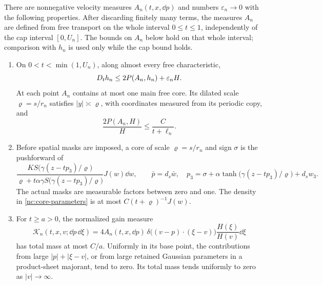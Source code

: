 \begin{lemma}
\label{nc:core-kernels}
There are nonnegative velocity measures \(A_n(t,x,\dd p)\) and numbers
\(\varepsilon_n\to0\) with the following properties.
After discarding finitely many terms,
the measures \(A_n\) are defined from free transport on the whole interval
\(0\le t\le1\), independently of the cap interval \([0,U_n]\).
The bounds on \(A_n\) below hold on that whole interval; comparison with
\(h_n\) is used only while the cap bound holds.

\begin{enumerate}[label=\textup{(\roman*)}]
\item On \(0<t<\min(1,U_n)\), along almost every free characteristic,
\begin{equation}
\label{nc:positive-equation}
 D_t h_n\le 2P(A_n,h_n)+\varepsilon_n H .
\end{equation}
At each point \(A_n\) contains at most one main free core.  Its dilated
scale \(\varrho=s/r_n\) satisfies \(|y|\asymp\varrho\), with coordinates measured
from its periodic copy, and
\[
 \frac{2P(A_n,H)}{H}\le\frac{C}{t+\ell_n}.
\]

\item Before spatial masks are imposed, a core of scale
\(\varrho=s/r_n\) and sign \(\sigma\) is the pushforward of
\begin{equation}
\label{nc:core-parameters}
 \frac{K S\bigl(\gamma(z-tp_3)/\varrho\bigr)}
      {\varrho+t\alpha\gamma S\bigl(\gamma(z-tp_3)/\varrho\bigr)}
 J(w)\dd w ,
 \qquad
 \bar p=d_s\bar w,\quad
 p_3=\sigma+\alpha\tanh\bigl(\gamma(z-tp_3)/\varrho\bigr)+d_sw_3 .
\end{equation}
The actual masks are measurable factors between zero and one.
The density in \eqref{nc:core-parameters} is at most
\(C(t+\varrho)^{-1}J(w)\).

\item For \(t\ge a>0\), the normalized gain measure
\begin{equation}
\label{nc:normalized-kernel}
 \mathcal K_n(t,x,v;\dd p\,\dd\xi)
 =
 4A_n(t,x,\dd p)\,
 \delta\bigl((v-p)\cdot(\xi-v)\bigr)
 \frac{H(\xi)}{H(v)}\dd\xi
\end{equation}
has total mass at most \(C/a\).  Uniformly in its base point, the
contributions from large \(|p|+|\xi-v|\), or from large retained
Gaussian parameters in a product-sheet majorant, tend to zero.
Its total mass tends uniformly to zero as \(|v|\to\infty\).
\end{enumerate}
\end{lemma}

